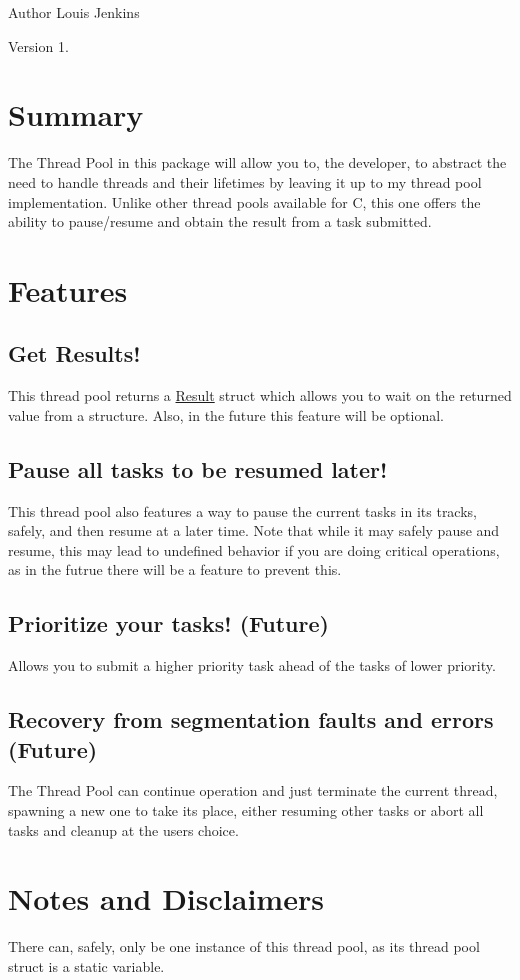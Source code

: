 \begin{DoxyAuthor}{Author}
Louis Jenkins 
\end{DoxyAuthor}
\begin{DoxyVersion}{Version}
1.
\end{DoxyVersion}
\hypertarget{index_list_summary}{}\section{Summary}\label{index_list_summary}
The Thread Pool in this package will allow you to, the developer, to abstract the need to handle threads and their lifetimes by leaving it up to my thread pool implementation. Unlike other thread pools available for C, this one offers the ability to pause/resume and obtain the result from a task submitted.\hypertarget{index_list_features}{}\section{Features}\label{index_list_features}
\hypertarget{index_results}{}\subsection{Get Results!}\label{index_results}
This thread pool returns a \hyperlink{struct_result}{Result} struct which allows you to wait on the returned value from a structure. Also, in the future this feature will be optional.\hypertarget{index_pause_and_resume}{}\subsection{Pause all tasks to be resumed later!}\label{index_pause_and_resume}
This thread pool also features a way to pause the current tasks in it\textquotesingle{}s tracks, safely, and then resume at a later time. Note that while it may safely pause and resume, this may lead to undefined behavior if you are doing critical operations, as in the futrue there will be a feature to prevent this.\hypertarget{index_priority}{}\subsection{Prioritize your tasks! (\+Future)}\label{index_priority}
Allows you to submit a higher priority task ahead of the tasks of lower priority.\hypertarget{index_recover}{}\subsection{Recovery from segmentation faults and errors (\+Future)}\label{index_recover}
The Thread Pool can continue operation and just terminate the current thread, spawning a new one to take it\textquotesingle{}s place, either resuming other tasks or abort all tasks and cleanup at the user\textquotesingle{}s choice.\hypertarget{index_notes}{}\section{Notes and Disclaimers}\label{index_notes}
There can, safely, only be one instance of this thread pool, as it\textquotesingle{}s thread pool struct is a static variable. 